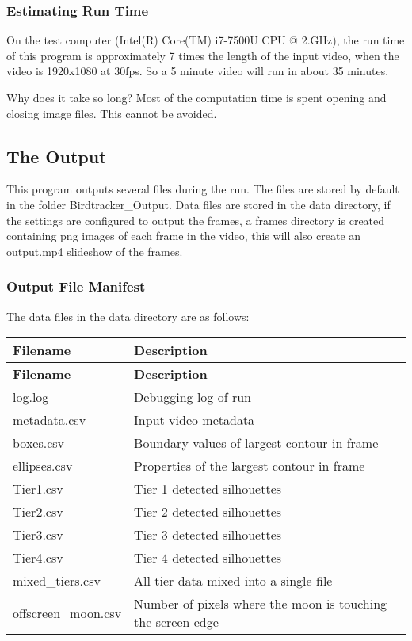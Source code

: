 \subsubsection*{Estimating Run Time}

On the test computer (Intel(\+R) Core(\+T\+M) i7-\/7500U C\+PU @ 2.\+G\+Hz), the run time of this program is approximately 7 times the length of the input video, when the video is 1920x1080 at 30fps. So a 5 minute video will run in about 35 minutes.

Why does it take so long? Most of the computation time is spent opening and closing image files. This cannot be avoided.

\subsection*{The Output}

This program outputs several files during the run. The files are stored by default in the folder {\ttfamily Birdtracker\+\_\+\+Output}. Data files are stored in the {\ttfamily data} directory, if the settings are configured to output the frames, a {\ttfamily frames} directory is created containing {\ttfamily png} images of each frame in the video, this will also create an {\ttfamily output.\+mp4} slideshow of the frames.

\subsubsection*{Output File Manifest}

The data files in the {\ttfamily data} directory are as follows\+:

\tabulinesep=1mm
\begin{longtabu} spread 0pt [c]{*{2}{|X[-1]}|}
\hline
\rowcolor{\tableheadbgcolor}\textbf{ Filename }&\textbf{ Description  }\\
\endfirsthead
\hline
\endfoot
\hline
\rowcolor{\tableheadbgcolor}\textbf{ Filename }&\textbf{ Description  }\\
\endhead
log.\+log &Debugging log of run \\
metadata.\+csv &Input video metadata \\
boxes.\+csv &Boundary values of largest contour in frame \\
ellipses.\+csv &Properties of the largest contour in frame \\
Tier1.\+csv &Tier 1 detected silhouettes \\
Tier2.\+csv &Tier 2 detected silhouettes \\
Tier3.\+csv &Tier 3 detected silhouettes \\
Tier4.\+csv &Tier 4 detected silhouettes \\
mixed\+\_\+tiers.\+csv &All tier data mixed into a single file \\
offscreen\+\_\+moon.\+csv &Number of pixels where the moon is touching the screen edge \\
\end{longtabu}


